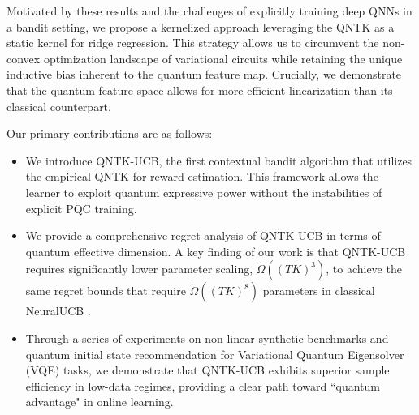\documentclass[pdflatex,sn-mathphys-num]{sn-jnl}%
\theoremstyle{thmstyleone}%
\theoremstyle{thmstyletwo}%
\theoremstyle{thmstylethree}%
\begin{document}
Motivated by these results and the challenges of explicitly training deep QNNs in a bandit setting, we propose a kernelized approach leveraging the QNTK as a static kernel for ridge regression. This strategy allows us to circumvent the non-convex optimization landscape of variational circuits while retaining the unique inductive bias inherent to the quantum feature map. Crucially, we demonstrate that the quantum feature space allows for more efficient linearization than its classical counterpart.

Our primary contributions are as follows:  
\begin{itemize}
\item  We introduce QNTK-UCB, the first contextual bandit algorithm that utilizes the empirical QNTK for reward estimation. This framework allows the learner to exploit quantum expressive power without the instabilities of explicit PQC training.
    \item We provide a comprehensive regret analysis of QNTK-UCB in terms of quantum effective dimension. A key finding of our work is that QNTK-UCB requires  significantly lower parameter scaling, $\tilde{\Omega}((TK)^3)$, to achieve the same regret bounds that require $\tilde{\Omega}((TK)^8)$ parameters in classical NeuralUCB \cite{neuralucb}.
    \item Through a series of experiments on non-linear synthetic benchmarks and quantum initial state recommendation for Variational Quantum Eigensolver (VQE) tasks, we demonstrate that QNTK-UCB exhibits superior sample efficiency in low-data regimes, providing a clear path toward ``quantum advantage" in online learning.
\end{itemize}
\end{document}
